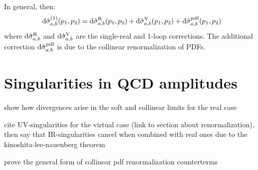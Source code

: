 In general, then:
\begin{equation}
  \mathrm{d}\hat{\sigma}_{a,b}^{(1)}(p_1 , p_2) = \mathrm{d}\hat{\sigma}^\text{R}_{a,b}(p_1 , p_2) + \mathrm{d}\hat{\sigma}^\text{V}_{a,b}(p_1 , p_2) + \mathrm{d}\hat{\sigma}^\text{pdf}_{a,b}(p_1 , p_2)
\end{equation}
where $ \mathrm{d}\hat{\sigma}^\text{R}_{a,b} $ and $ \mathrm{d}\hat{\sigma}^\text{V}_{a,b} $ are the single-real and 1-loop corrections. The additional correction $ \mathrm{d}\hat{\sigma}^\text{pdf}_{a,b} $ is due to the collinear renormalization of PDFs.

\section{Singularities in QCD amplitudes}

show how divergences arise in the soft and collinear limits for the real case

cite UV-singularities for the virtual case (link to section about renormalization), then say that IR-singularities cancel when combined with real ones due to the kinoshita-lee-nauenberg theorem

prove the general form of collinear pdf renormalization counterterms










